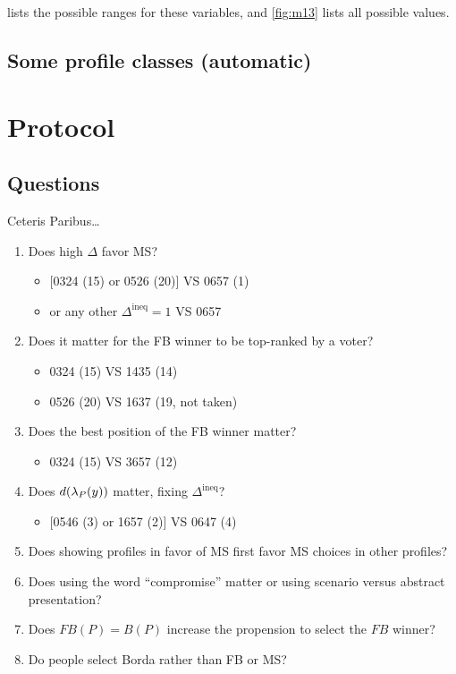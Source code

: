 \documentclass[pagesize, twoside=off, bibliography=totoc, DIV=calc, fontsize=12pt, a4paper]{scrartcl}
\begin{document}
 lists the possible ranges for these variables, and \cref{fig:m13} lists all possible values.

\subsection{Some profile classes (automatic)}


\section{Protocol}
\subsection{Questions}
Ceteris Paribus…
\begin{enumerate}
	\item Does high $\Delta$ favor MS?
	\begin{itemize}
		\item {}[0324 (15) or 0526 (20)] VS 0657 (1)
		\item or any other $\Delta^\text{ineq} = 1$ VS 0657
	\end{itemize}
	\item Does it matter for the FB winner to be top-ranked by a voter? 
	\begin{itemize}
		\item 0324 (15) VS 1435 (14)
		\item 0526 (20) VS 1637 (19, not taken)
	\end{itemize}
	\item Does the best position of the FB winner matter?
	\begin{itemize}
		\item 0324 (15) VS 3657 (12)
	\end{itemize}
	\item Does $d(\lambda_P(y))$ matter, fixing $\Delta^\text{ineq}$?
	\begin{itemize}
		\item{} [0546 (3) or 1657 (2)] VS 0647 (4)
	\end{itemize}
	\item Does showing profiles in favor of MS first favor MS choices in other profiles?
	\item Does using the word “compromise” matter or using scenario  versus abstract presentation?
	\item Does $FB(P) = B(P)$ increase the propension to select the $FB$ winner?
	\item Do people select Borda rather than FB or MS?
\end{enumerate}
\end{document}
